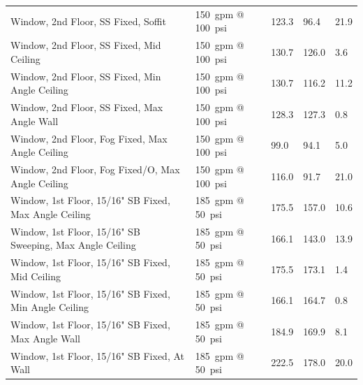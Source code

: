 \documentclass[12pt,oneside]{book}
\begin{document}
\begin{table}[!ht]
\begin{tabular}{lllll}
Window, 2nd Floor, SS Fixed, Soffit                      & 150~gpm @ 100~psi              & 123.3                             & 96.4                               & 21.9                   \\
Window, 2nd Floor, SS Fixed, Mid Ceiling                 & 150~gpm @ 100~psi              & 130.7                             & 126.0                              & 3.6                    \\
Window, 2nd Floor, SS Fixed, Min Angle Ceiling           & 150~gpm @ 100~psi              & 130.7                             & 116.2                              & 11.2                   \\
Window, 2nd Floor, SS Fixed, Max Angle Wall              & 150~gpm @ 100~psi              & 128.3                             & 127.3                              & 0.8                    \\
Window, 2nd Floor, Fog Fixed, Max Angle Ceiling          & 150~gpm @ 100~psi              &  99.0                             & 94.1                               & 5.0                    \\
Window, 2nd Floor, Fog Fixed/O, Max Angle Ceiling        & 150~gpm @ 100~psi              & 116.0                             & 91.7                               & 21.0                   \\
Window, 1st Floor, 15/16" SB Fixed, Max Angle Ceiling    & 185~gpm @ 50~psi               & 175.5                             & 157.0                              & 10.6                   \\
Window, 1st Floor, 15/16" SB Sweeping, Max Angle Ceiling & 185~gpm @ 50~psi               & 166.1                             & 143.0                              & 13.9                   \\
Window, 1st Floor, 15/16" SB Fixed, Mid Ceiling          & 185~gpm @ 50~psi               & 175.5                             & 173.1                              & 1.4                    \\
Window, 1st Floor, 15/16" SB Fixed, Min Angle Ceiling    & 185~gpm @ 50~psi               & 166.1                             & 164.7                              & 0.8                    \\
Window, 1st Floor, 15/16" SB Fixed, Max Angle Wall       & 185~gpm @ 50~psi               & 184.9                             & 169.9                              & 8.1                    \\
Window, 1st Floor, 15/16" SB Fixed, At Wall              & 185~gpm @ 50~psi               & 222.5                             & 178.0                              & 20.0                   \\

\end{tabular}
\end{table}
\end{document}

